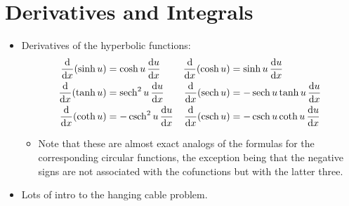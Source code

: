 \documentclass[../main.tex]{subfiles}
\begin{document}
\section{Derivatives and Integrals}\label{sss:8.3}
\begin{itemize}
    \item {}Derivatives of the hyperbolic functions:
    \begin{align*}
        \dv{x}(\sinh u) &= \cosh u\, \dv{u}{x}&
        \dv{x}(\cosh u) &= \sinh u\, \dv{u}{x}\\
        \dv{x}(\tanh u) &= \sech^2 u\, \dv{u}{x}&
        \dv{x}(\sech u) &= -\sech u\tanh u\, \dv{u}{x}\\
        \dv{x}(\coth u) &= -\csch^2 u\, \dv{u}{x}&
        \dv{x}(\csch u) &= -\csch u\coth u\, \dv{u}{x}
    \end{align*}
    \begin{itemize}
        \item Note that these are almost exact analogs of the formulas for the corresponding circular functions, the exception being that the negative signs are not associated with the cofunctions but with the latter three.
    \end{itemize}
    \item Lots of intro to the hanging cable problem.
\end{itemize}
\end{document}
